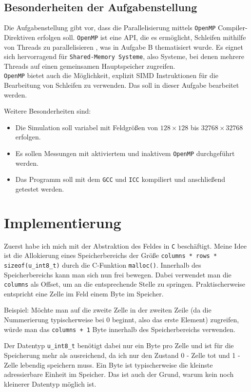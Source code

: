 \documentclass[german,plainarticle,hyperref,utf8]{zihpub}
\begin{document}
	\subsection{Besonderheiten der Aufgabenstellung}
	Die Aufgabenstellung gibt vor, dass die Parallelisierung mittels \texttt{OpenMP} Compiler-Direktiven erfolgen soll. \texttt{OpenMP} ist eine API, die es ermöglicht, Schleifen mithilfe von Threads zu parallelisieren \cite{openmp}, was in Aufgabe B thematisiert wurde. Es eignet sich hervorragend für \texttt{Shared-Memory Systeme}, also Systeme, bei denen mehrere Threads auf einen gemeinsamen Hauptspeicher zugreifen.\\
	\texttt{OpenMP} bietet auch die Möglichkeit, explizit SIMD Instruktionen für die Bearbeitung von Schleifen zu verwenden. Das soll in dieser Aufgabe bearbeitet werden.
	
	Weitere Besonderheiten sind:
	\begin{itemize}
		\item Die Simulation soll variabel mit Feldgrößen von $128\times 128$ bis $32768\times 32768$ erfolgen.
		\item Es sollen Messungen mit aktiviertem und inaktivem \texttt{OpenMP} durchgeführt werden.
		\item Das Programm soll mit dem \texttt{GCC} und \texttt{ICC} kompiliert und anschließend getestet werden.
	\end{itemize}
	\newpage
	\section{Implementierung}
	Zuerst habe ich mich mit der Abstraktion des Feldes in \texttt{C} beschäftigt. Meine Idee ist die Allokierung eines Speicherbereichs der Größe \texttt{columns * rows * sizeof(u\_int8\_t)} durch die C-Funktion \texttt{malloc()}. Innerhalb des Speicherbereichs kann man sich nun frei bewegen. Dabei verwendet man die \texttt{columns} als Offset, um an die entsprechende Stelle zu springen. Praktischerweise entspricht eine Zelle im Feld einem Byte im Speicher.
	
	Beispiel: Möchte man auf die zweite Zelle in der zweiten Zeile (da die Nummerierung typischerweise bei 0 beginnt, also das erste Element) zugreifen, würde man das \texttt{columns + 1} Byte innerhalb des Speicherbereichs verwenden.
	
	Der Datentyp \texttt{u\_int8\_t} benötigt dabei nur ein Byte pro Zelle und ist für die Speicherung mehr als ausreichend, da ich nur den Zustand 0 - Zelle tot und 1 - Zelle lebendig speichern muss. Ein Byte ist typischerweise die kleinste adressierbare Einheit im Speicher. Das ist auch der Grund, warum kein noch kleinerer Datentyp möglich ist.\\
	
\end{document}
